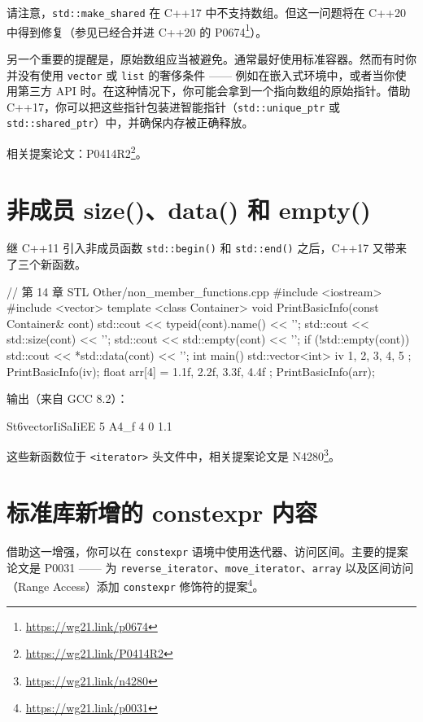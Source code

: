 请注意，\texttt{std::make\_shared} 在 C++17 中不支持数组。但这一问题将在 C++20 中得到修复（参见已经合并进 C++20 的 P0674\footnote{\url{https://wg21.link/p0674}}）。

另一个重要的提醒是，原始数组应当被避免。通常最好使用标准容器。然而有时你并没有使用 \texttt{vector} 或 \texttt{list} 的奢侈条件 —— 例如在嵌入式环境中，或者当你使用第三方 API 时。在这种情况下，你可能会拿到一个指向数组的原始指针。借助 C++17，你可以把这些指针包装进智能指针（\texttt{std::unique\_ptr} 或 \texttt{std::shared\_ptr}）中，并确保内存被正确释放。

相关提案论文：P0414R2\footnote{\url{https://wg21.link/P0414R2}}。


\section{非成员 size()、data() 和 empty()}

继 C++11 引入非成员函数 \texttt{std::begin()} 和 \texttt{std::end()} 之后，C++17 又带来了三个新函数。

\begin{codebox}[cpp]
// 第 14 章 STL Other/non_member_functions.cpp
#include <iostream>
#include <vector>
template <class Container>
void PrintBasicInfo(const Container& cont) {
std::cout << typeid(cont).name() << '\n';
std::cout << std::size(cont) << '\n';
std::cout << std::empty(cont) << '\n';
if (!std::empty(cont))
std::cout << *std::data(cont) << '\n';
}
int main() {
std::vector<int> iv { 1, 2, 3, 4, 5 };
PrintBasicInfo(iv);
float arr[4] = { 1.1f, 2.2f, 3.3f, 4.4f };
PrintBasicInfo(arr);
}
\end{codebox}

输出（来自 GCC 8.2）：

\begin{codebox}
St6vectorIiSaIiEE
5
A4_f
4
0
1.1
\end{codebox}

这些新函数位于 \texttt{<iterator>} 头文件中，相关提案论文是 N4280\footnote{\url{https://wg21.link/n4280}}。


\section{标准库新增的 constexpr 内容}

借助这一增强，你可以在 \texttt{constexpr} 语境中使用迭代器、访问区间。主要的提案论文是 P0031 —— 为 \texttt{reverse\_iterator}、\texttt{move\_iterator}、\texttt{array} 以及区间访问（Range Access）添加 \texttt{constexpr} 修饰符的提案\footnote{\url{https://wg21.link/p0031}}。

